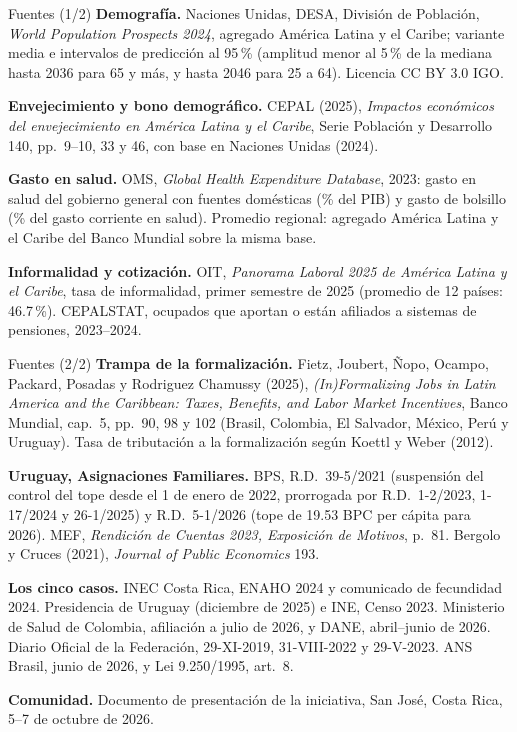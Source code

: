 \documentclass[aspectratio=169,11pt]{beamer}
\begin{document}
\begin{frame}{Fuentes (1/2)}
  \scriptsize
  \textbf{Demografía.} Naciones Unidas, DESA, División de Población, \emph{World Population Prospects 2024}, agregado América Latina y el Caribe; variante media e intervalos de predicción al 95\,\% (amplitud menor al 5\,\% de la mediana hasta 2036 para 65 y más, y hasta 2046 para 25 a 64). Licencia CC BY 3.0 IGO.

  \medskip
  \textbf{Envejecimiento y bono demográfico.} CEPAL (2025), \emph{Impactos económicos del envejecimiento en América Latina y el Caribe}, Serie Población y Desarrollo 140, pp.~9--10, 33 y 46, con base en Naciones Unidas (2024).

  \medskip
  \textbf{Gasto en salud.} OMS, \emph{Global Health Expenditure Database}, 2023: gasto en salud del gobierno general con fuentes domésticas (\% del PIB) y gasto de bolsillo (\% del gasto corriente en salud). Promedio regional: agregado América Latina y el Caribe del Banco Mundial sobre la misma base.

  \medskip
  \textbf{Informalidad y cotización.} OIT, \emph{Panorama Laboral 2025 de América Latina y el Caribe}, tasa de informalidad, primer semestre de 2025 (promedio de 12 países: 46.7\,\%). CEPALSTAT, ocupados que aportan o están afiliados a sistemas de pensiones, 2023--2024.
\end{frame}

\begin{frame}{Fuentes (2/2)}
  \scriptsize
  \textbf{Trampa de la formalización.} Fietz, Joubert, Ñopo, Ocampo, Packard, Posadas y Rodriguez Chamussy (2025), \emph{(In)Formalizing Jobs in Latin America and the Caribbean: Taxes, Benefits, and Labor Market Incentives}, Banco Mundial, cap.~5, pp.~90, 98 y 102 (Brasil, Colombia, El Salvador, México, Perú y Uruguay). Tasa de tributación a la formalización según Koettl y Weber (2012).

  \medskip
  \textbf{Uruguay, Asignaciones Familiares.} BPS, R.D.~39-5/2021 (suspensión del control del tope desde el 1 de enero de 2022, prorrogada por R.D.~1-2/2023, 1-17/2024 y 26-1/2025) y R.D.~5-1/2026 (tope de 19.53 BPC per cápita para 2026). MEF, \emph{Rendición de Cuentas 2023, Exposición de Motivos}, p.~81. Bergolo y Cruces (2021), \emph{Journal of Public Economics} 193.

  \medskip
  \textbf{Los cinco casos.} INEC Costa Rica, ENAHO 2024 y comunicado de fecundidad 2024. Presidencia de Uruguay (diciembre de 2025) e INE, Censo 2023. Ministerio de Salud de Colombia, afiliación a julio de 2026, y DANE, abril--junio de 2026. Diario Oficial de la Federación, 29-XI-2019, 31-VIII-2022 y 29-V-2023. ANS Brasil, junio de 2026, y Lei 9.250/1995, art.~8.

  \medskip
  \textbf{Comunidad.} Documento de presentación de la iniciativa, San José, Costa Rica, 5--7 de octubre de 2026.
\end{frame}
\end{document}

